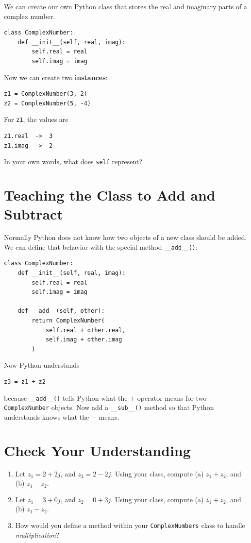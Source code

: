 \documentclass{article}
\begin{document}
We can create our own Python class that stores the real and
imaginary parts of a complex number.

\begin{verbatim}
class ComplexNumber:
    def __init__(self, real, imag):
        self.real = real
        self.imag = imag
\end{verbatim}

Now we can create two \textbf{instances}:

\begin{verbatim}
z1 = ComplexNumber(3, 2)
z2 = ComplexNumber(5, -4)
\end{verbatim}

For \texttt{z1}, the values are

\begin{verbatim}
z1.real  ->  3
z1.imag  ->  2
\end{verbatim}

In your own words, what does \texttt{self} represent?

\section{Teaching the Class to Add and Subtract}

Normally Python does not know how two objects of a new class should be added. We can define that behavior with the special method \texttt{\_\_add\_\_()}:

\begin{verbatim}
class ComplexNumber:
    def __init__(self, real, imag):
        self.real = real
        self.imag = imag

    def __add__(self, other):
        return ComplexNumber(
            self.real + other.real,
            self.imag + other.imag
        )
\end{verbatim}

Now Python understands

\begin{verbatim}
z3 = z1 + z2
\end{verbatim}

because \texttt{\_\_add\_\_()} tells Python what the \(+\) operator means for two \texttt{ComplexNumber} objects.  Now add a \texttt{\_\_sub\_\_()} method so that Python understands knows what the \(-\) means.

\section{Check Your Understanding}

\begin{enumerate}
\item Let $z_1 = 2+2j$, and $z_2 = 2-2j$.  Using your class, compute (a) $z_1 + z_2$, and (b) $z_1 - z_2$.
\item Let $z_1 = 3+0j$, and $z_2 = 0+3j$.  Using your class, compute (a) $z_1 + z_2$, and (b) $z_1 - z_2$.
\item How would you define a method within your \verb+ComplexNumbers+ class to handle \textit{multiplication}?
\end{enumerate}
\end{document}
